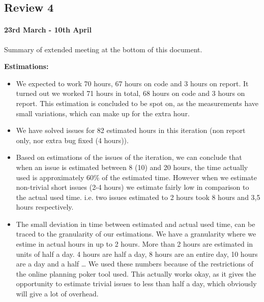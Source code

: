 \subsection{Review 4}
\paragraph{23rd March - 10th April}


Summary of extended meeting at the bottom of this document.

\textbf{Estimations:}
\begin{itemize}
\item We expected to work 70 hours, 67 hours on code and 3 hours on report. It turned out we worked 71 hours in total, 68 hours on code and 3 hours on report. This estimation is concluded to be spot on, as the measurements have small variations, which can make up for the extra hour.
\item We have solved issues for 82 estimated hours in this iteration (non report only, nor extra bug fixed (4 hours)).
\item Based on estimations of the issues of the iteration, we can conclude that when an issue is estimated between 8 (10) and 20 hours, the time actually used is approximately 60\% of the estimated time. However when we estimate non-trivial short issues (2-4 hours) we estimate fairly low in comparison to the actual used time. i.e. two issues estimated to 2 hours took 8 hours and 3,5 hours respectively.
\item The small deviation in time between estimated and actual used time, can be traced to the granularity of our estimations. We have a granularity where we estime in actual hours in up to 2 hours. More than 2 hours are estimated in units of half a day. 4 hours are half a day, 8 hours are an entire day, 10 hours are a day and a half … We used these numbers because of the restrictions of the online planning poker tool used.
This actually works okay, as it gives the opportunity to estimate trivial issues to less than half a day, which obviously will give a lot of overhead.

\end{itemize}


